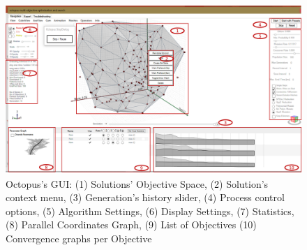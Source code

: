 	\begin{figure}[h]
		\centering
		\includegraphics[width=1\textwidth]{Images/Background/Octopus/octopus-menu.png}
		\caption[Octopus GUI]{Octopus's \ac{GUI}: (1) Solutions' Objective Space, (2) Solution's context menu, (3) Generation's history slider, (4) Process control options, (5) Algorithm Settings, (6) Display Settings, (7) Statistics, (8) Parallel Coordinates Graph, (9) List of Objectives (10) Convergence graphs per Objective}
		\label{fig:octopus}
	\end{figure}
	
